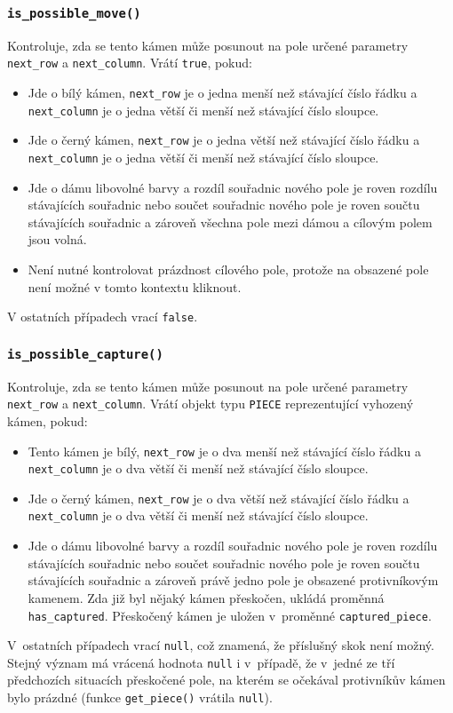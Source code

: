 \documentclass[a4paper,12pt]{article}
\begin{document}
	\subsubsection*{\texttt{is\_possible\_move()}}
	Kontroluje, zda se tento kámen může posunout na pole určené
	parametry \texttt{next\_row} a \texttt{next\_column}. Vrátí
	\texttt{true}, pokud:
	\begin{itemize}
		\item Jde o bílý kámen, \texttt{next\_row} je o jedna menší než stávající číslo řádku 
	          a \texttt{next\_column} je o jedna větší či menší než stávající číslo sloupce.
		\item Jde o černý kámen, \texttt{next\_row} je o jedna větší než stávající číslo řádku 
		      a \texttt{next\_column} je o jedna větší či menší než stávající číslo sloupce.
		\item Jde o dámu libovolné barvy a rozdíl souřadnic nového pole je roven rozdílu stávajících
		      souřadnic nebo součet souřadnic nového pole je roven součtu stávajících souřadnic a
		      zároveň všechna pole mezi dámou a cílovým polem jsou volná.
		\item Není nutné kontrolovat prázdnost cílového pole, protože na obsazené pole není možné
		      v tomto kontextu kliknout.
	\end{itemize}
	V ostatních případech vrací \texttt{false}.
	
	\subsubsection*{\texttt{is\_possible\_capture()}}
	Kontroluje, zda se tento kámen může posunout na pole určené parametry \texttt{next\_row} a \texttt{next\_column}.
	Vrátí objekt typu \texttt{PIECE} reprezentující vyhozený kámen, pokud:
	\begin{itemize}
		\item Tento kámen je bílý, \texttt{next\_row} je o dva menší než stávající číslo řádku 
		      a \texttt{next\_column} je o dva větší či menší než stávající číslo sloupce.
		\item Jde o černý kámen, \texttt{next\_row} je o dva větší než stávající číslo řádku 
		      a \texttt{next\_column} je o dva větší či menší než stávající číslo sloupce.
		\item Jde o dámu libovolné barvy a rozdíl souřadnic nového pole je roven rozdílu stávajících
		      souřadnic nebo součet souřadnic nového pole je roven součtu stávajících souřadnic a
		      zároveň právě jedno pole je obsazené protivníkovým kamenem. Zda již byl nějaký
		      kámen přeskočen, ukládá proměnná \texttt{has\_captured}. Přeskočený kámen je uložen
		      v~proměnné \texttt{captured\_piece}.
	\end{itemize}
	V~ostatních případech vrací \texttt{null}, což znamená, že příslušný skok není možný. Stejný
	význam má vrácená hodnota \texttt{null} i v~případě, že v~jedné ze tří předchozích situacích
	přeskočené pole, na kterém se očekával protivníkův kámen bylo prázdné (funkce
	\verb|get_piece()| vrátila \texttt{null}).
	
\end{document}
